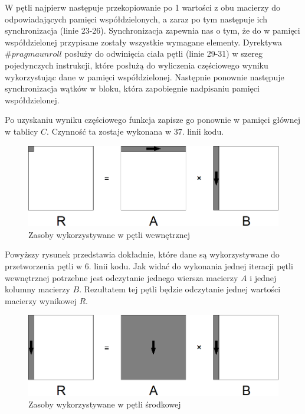 \documentclass{article}
\begin{document}
W pętli najpierw następuje przekopiowanie po 1 wartości z obu macierzy do odpowiadających pamięci współdzielonych, a zaraz po tym następuje ich synchronizacja (linie 23-26). Synchronizacja zapewnia nas o tym, że do w pamięci współdzielonej przypisane zostały wszystkie wymagane elementy. Dyrektywa $\#pragma unroll$ posłuży do odwinięcia ciała pętli (linie 29-31) w szereg pojedynczych instrukcji, które posłużą do wyliczenia częściowego wyniku wykorzystując dane w pamięci współdzielonej. Następnie ponownie następuje synchronizacja wątków w bloku, która zapobiegnie nadpisaniu pamięci współdzielonej.

Po uzyskaniu wyniku częściowego funkcja zapisze go ponownie w pamięci głównej w tablicy $C$. Czynność ta zostaje wykonana w 37. linii kodu.

\begin{figure}[H]
	\centering
	\includegraphics[width=\linewidth]{./images/3/lokIn.png}
	\caption{Zasoby wykorzystywane w pętli wewnętrznej}
	\label{fig:3inner}
\end{figure}

Powyższy rysunek przedstawia dokładnie, które dane są wykorzystywane do przetworzenia pętli w 6. linii kodu. Jak widać do wykonania jednej iteracji pętli wewnętrznej potrzebne jest odczytanie jednego wiersza macierzy $A$ i jednej kolumny macierzy $B$. Rezultatem tej pętli będzie odczytanie jednej wartości macierzy wynikowej $R$.

\begin{figure}[H]
	\centering
	\includegraphics[width=\linewidth]{./images/3/lokMed.png}
	\caption{Zasoby wykorzystywane w pętli środkowej}
	\label{fig:3medium}
\end{figure}
\end{document}
